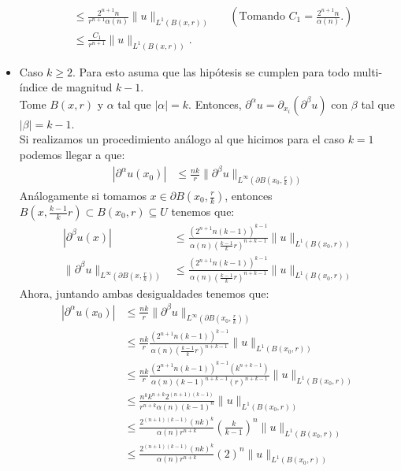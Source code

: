 \begin{homeworkProblem}
\begin{solucion}
\begin{itemize}
\begin{align}
          &\leq \frac{2^{n+1}n}{r^{n+1}\alpha(n)}\|u\|_{L^{1}(B(x,r))} &&\left(\text{Tomando $C_1=\frac{2^{n+1}n}{\alpha(n)}$.}\right)\\
          &\leq \frac{C_1}{r^{n+1}}\|u\|_{L^{1}(B(x,r))}.
        \end{align}
      \item Caso $k\geq 2$.
        Para esto asuma que las hipótesis se cumplen para todo multi-índice de magnitud $k-1$.\\
        Tome $B(x,r)$ y $\alpha$ tal que $|\alpha|=k$. Entonces, $\partial^{\alpha}u=\partial_{x_i}(\partial^{\beta}u)$ con $\beta$ tal que $|\beta|=k-1$.\\
        Si realizamos un procedimiento análogo al que hicimos para el caso $k=1$ podemos llegar a que:
        \begin{align*}
          |\partial^{\alpha}u(x_0)|&\leq \frac{nk}{r}\|\partial^{\beta}u\|_{L^{\infty}(\partial B(x_0,\frac{r}{k}))}
        \end{align*}
        Análogamente si tomamos $x\in \partial B(x_0,\frac{r}{k})$, entonces $B(x,\frac{k-1}{k}r)\subset B(x_0,r)\subseteq U$ tenemos que:
        \begin{align*}
          |\partial^{\beta}u(x)|&\leq\frac{(2^{n+1}n(k-1))^{k-1}}{\alpha(n)\left( \frac{k-1}{k}r \right)^{n+k-1}}\|u\|_{L^{1}(B(x_0,r))}\\
          \|\partial^{\beta}u\|_{L^{\infty}(\partial B(x,\frac{r}{k}))}&\leq\frac{(2^{n+1}n(k-1))^{k-1}}{\alpha(n)\left( \frac{k-1}{k}r \right)^{n+k-1}}\|u\|_{L^{1}(B(x_0,r))}
        \end{align*}
        Ahora, juntando ambas desigualdades tenemos que:
        \begin{align*}
          |\partial^{\alpha}u(x_0)|&\leq \frac{nk}{r}\|\partial^{\beta}u\|_{L^{\infty}(\partial B(x_0,\frac{r}{k}))}\\
          &\leq \frac{nk}{r}\frac{(2^{n+1}n(k-1))^{k-1}}{\alpha(n)\left( \frac{k-1}{k}r \right)^{n+k-1}}\|u\|_{L^{1}(B(x_0,r))}\\
          &\leq \frac{nk}{r}\frac{(2^{n+1}n(k-1))^{k-1}(k^{n+k-1})}{\alpha(n)(k-1)^{n+k-1}(r)^{n+k-1}}\|u\|_{L^{1}(B(x_0,r))}\\
          &\leq \frac{n^kk^{n+k}2^{(n+1)(k-1)}}{r^{n+k}\alpha(n)(k-1)^n}\|u\|_{L^{1}(B(x_0,r))}\\
          &\leq \frac{2^{(n+1)(k-1)}(nk)^{k}}{\alpha(n)r^{n+k}}\left( \frac{k}{k-1} \right)^n\|u\|_{L^{1}(B(x_0,r))}\\
          &\leq \frac{2^{(n+1)(k-1)}(nk)^k}{\alpha(n)r^{n+k}}(2)^{n}\|u\|_{L^{1}(B(x_0,r))}\\

\end{align*}
\end{itemize}
\end{solucion}
\end{homeworkProblem}
